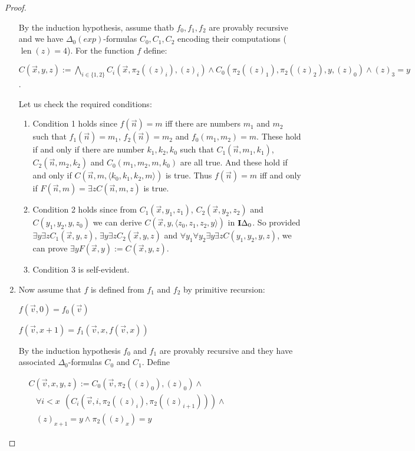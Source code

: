 \documentclass[8pt]{article}
\theoremstyle{definition}
\theoremstyle{definition}
\theoremstyle{definition}
\theoremstyle{definition}
\theoremstyle{definition}
\theoremstyle{definition}
\theoremstyle{definition}
\theoremstyle{definition}
\theoremstyle{definition}
\theoremstyle{definition}
\theoremstyle{definition}
\theoremstyle{definition}
\theoremstyle{definition}
\theoremstyle{question}
\begin{document}
\begin{proof}
\begin{enumerate}
    By the induction hypothesis, assume thatb $f_0, f_1, f_2$ are provably recursive and we have 
    $\Delta_0(exp)$-formulas $C_0, C_1, C_2$ encoding their computations ($\operatorname{len}(z) = 4$).
    For the function $f$ define:
    \begin{center}
      $C(\vec{x}, y, z) := \bigwedge \limits_{i \in \{ 1, 2\}} C_i(\vec{x}, \pi_2((z)_i), (z)_i) \land 
      C_0(\pi_2((z)_1), \pi_2((z)_2), y, (z)_0) \land (z)_3 = y$.
    \end{center}

    Let us check the required conditions:
    \begin{enumerate}
      \item Condition 1 holds since $f(\vec{n}) = m$ iff there are numbers $m_1$ and $m_2$ such that
      $f_1(\vec{n}) = m_1$, $f_2(\vec{n}) = m_2$ and $f_0(m_1, m_2) = m$.
      These hold if and only if there are number $k_1, k_2, k_0$ such that 
      $C_1(\vec{n}, m_1, k_1)$, $C_2(\vec{n}, m_2, k_2)$ and $C_0(m_1, m_2, m, k_0)$ are all true.
      And these hold if and only if $C(\vec{n}, m, \langle k_0, k_1, k_2, m \rangle)$ is true.
      Thus $f(\vec{n}) = m $ iff and only if $F(\vec{n}, m) = \exists z C(\vec{n}, m, z)$ is true.
      \item Condition 2 holds since from $C_1(\vec{x}, y_1, z_1)$, $C_2(\vec{x}, y_2, z_2)$
      and $C(y_1, y_2, y, z_0)$ we can derive 
      $C(\vec{x}, y, \langle z_0, z_1, z_2, y \rangle)$ in ${\bf I}\Delta_0$.
      So provided $\exists y \exists z C_1(\vec{x}, y, z)$, $\exists y \exists z C_2(\vec{x}, y, z)$ and
      $\forall y_1 \forall y_2 \exists y \exists z C(y_1, y_2, y, z)$, we can prove $\exists y F(\vec{x}, y) := 
      C(\vec{x}, y, z)$.
      \item Condition 3 is self-evident.
    \end{enumerate}
    \item Now assume that $f$ is defined from $f_1$ and $f_2$ by primitive recursion:
    \begin{center}
      $f(\vec{v}, 0) = f_0(\vec{v})$

      $f(\vec{v}, x + 1) = f_1(\vec{v}, x, f(\vec{v}, x))$
    \end{center}
    By the induction hypothesis $f_0$ and $f_1$ are provably recursive and they have associated $\Delta_0$-formulas
    $C_0$ and $C_1$. Define
    \begin{center}
    $\begin{array}{lll}
      & C(\vec{v}, x, y, z) := C_0(\vec{v}, \pi_2((z)_0), (z)_0) \land & \\
      & \:\:\:\: \forall i < x \:\: (C_i (\vec{v}, i, \pi_2((z)_i), \pi_2((z)_{i + 1}))) \land & \\
      & \:\:\:\: (z)_{x + 1} = y \land \pi_2((z)_x) = y &
    \end{array}$
  \end{center}


\end{enumerate}
\end{proof}
\end{document}
